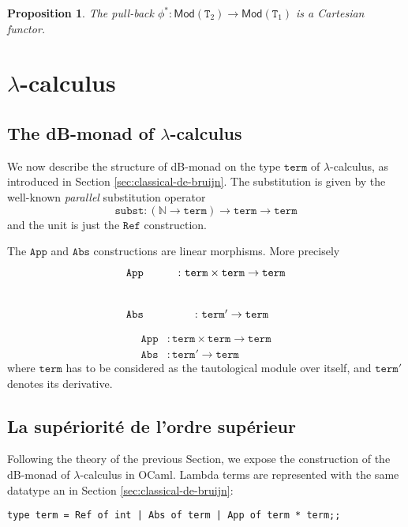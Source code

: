 \documentclass[a4paper,twoside,12pt]{article}
\newtheorem{proposition}{Proposition}
\theoremstyle{definition}
\theoremstyle{remark}
\theoremstyle{example}
\newcommand{\NN}{\mathbb{N}}
\newcommand{\TT}{\mathtt{T}}
\begin{document}
\begin{proposition}
  \label{prop:pull-back-functor}
  The pull-back
  $\phi^* \colon \mathsf{Mod}(\TT_2) \to \mathsf{Mod}(\TT_1)$ is a
  Cartesian functor.
\end{proposition}

\section{$\lambda$-calculus}
\label{sec:lambda-calculus}

\subsection{The dB-monad of $\lambda$-calculus}
\label{sec:db-monad-lambda}

We now describe the structure of dB-monad on the type $\mathtt{term}$
of $\lambda$-calculus, as introduced in Section
\ref{sec:classical-de-bruijn}.  The substitution is given by the
well-known \emph{parallel} substitution operator
\begin{equation*}
  \mathtt{subst}\colon (\NN \to \mathtt{term}) \to
  \mathtt{term} \to \mathtt{term}
\end{equation*}
and the unit is just the $\mathtt{Ref}$ construction.

The $\mathtt{App}$ and $\mathtt{Abs}$ constructions are linear
morphisms.  More precisely
\begin{equation*}
  \xymatrix{
    \mathtt{App} &\colon \mathtt{term} \times \mathtt{term} \to
                 \mathtt{term} \\
  \mathtt{Abs} &\colon \mathtt{term}' \to \mathtt{term}}
\end{equation*}

\begin{align*}
  \mathtt{App} &\colon \mathtt{term} \times \mathtt{term} \to
                 \mathtt{term} \\
\mathtt{Abs} &\colon \mathtt{term}' \to \mathtt{term}
\end{align*}
where $\mathtt{term}$ has to be considered as the tautological module
over itself, and $\mathtt{term}'$ denotes its derivative.




\subsection{La supériorité de l'ordre supérieur}
\label{sec:super}

Following the theory of the previous Section, we expose the
construction of the dB-monad of $\lambda$-calculus in OCaml.  Lambda
terms are represented with the same datatype an in Section
\ref{sec:classical-de-bruijn}:
\begin{verbatim}
type term = Ref of int | Abs of term | App of term * term;;
\end{verbatim}
\end{document}

